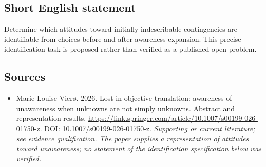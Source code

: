 \documentclass[11pt]{article}
\begin{document}
\subsection{Short English statement}
Determine which attitudes toward initially indescribable contingencies are identifiable from choices before and after awareness expansion. This precise identification task is proposed rather than verified as a published open problem.

\subsection{Sources}
\begin{itemize}\raggedright
\item[\textnormal{[S1]}]\hypertarget{source:30007557:1}{} Marie-Louise Vierø. 2026. Lost in objective translation: awareness of unawareness when unknowns are not simply unknowns. Abstract and representation results.
\url{https://link.springer.com/article/10.1007/s00199-026-01750-z}.
DOI: 10.1007/s00199-026-01750-z.
{\small\textit{Supporting or current literature; see evidence qualification. The paper supplies a representation of attitudes toward unawareness; no statement of the identification specification below was verified.}}
\end{itemize}
\end{document}
